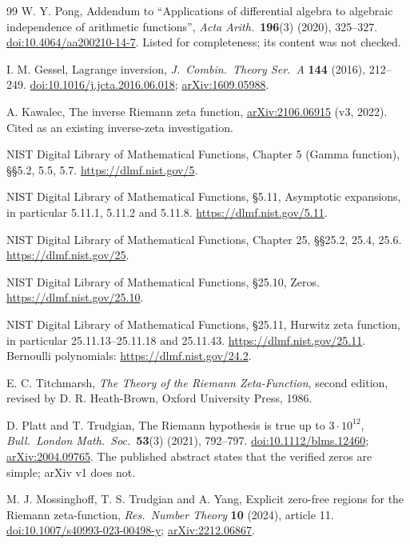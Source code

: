 \documentclass[11pt,a4paper]{article}
\numberwithin{equation}{section}
\theoremstyle{definition}
\theoremstyle{remark}
\begin{document}
\begin{thebibliography}{99}
W. Y. Pong, Addendum to ``Applications of differential algebra to algebraic
independence of arithmetic functions'', \emph{Acta Arith.}\ \textbf{196}(3)
(2020), 325--327.
\href{https://doi.org/10.4064/aa200210-14-7}{doi:10.4064/aa200210-14-7}. Listed
for completeness; its content was not checked.

I. M. Gessel, Lagrange inversion, \emph{J.\ Combin.\ Theory Ser.\ A}
\textbf{144} (2016), 212--249.
\href{https://doi.org/10.1016/j.jcta.2016.06.018}{doi:10.1016/j.jcta.2016.06.018};
\href{https://arxiv.org/abs/1609.05988}{arXiv:1609.05988}.

A. Kawalec, The inverse Riemann zeta function,
\href{https://arxiv.org/abs/2106.06915}{arXiv:2106.06915} (v3, 2022). Cited
as an existing inverse-zeta investigation.

NIST Digital Library of Mathematical Functions, Chapter 5 (Gamma function),
\S\S5.2, 5.5, 5.7. \url{https://dlmf.nist.gov/5}.

NIST Digital Library of Mathematical Functions, \S5.11, Asymptotic
expansions, in particular 5.11.1, 5.11.2 and 5.11.8.
\url{https://dlmf.nist.gov/5.11}.

NIST Digital Library of Mathematical Functions, Chapter 25, \S\S25.2, 25.4,
25.6. \url{https://dlmf.nist.gov/25}.

NIST Digital Library of Mathematical Functions, \S25.10, Zeros.
\url{https://dlmf.nist.gov/25.10}.

NIST Digital Library of Mathematical Functions, \S25.11, Hurwitz zeta
function, in particular 25.11.13--25.11.18 and 25.11.43.
\url{https://dlmf.nist.gov/25.11}. Bernoulli polynomials:
\url{https://dlmf.nist.gov/24.2}.

E. C. Titchmarsh, \emph{The Theory of the Riemann Zeta-Function}, second edition,
revised by D. R. Heath-Brown, Oxford University Press, 1986.

D. Platt and T. Trudgian, The Riemann hypothesis is true up to $3\cdot10^{12}$,
\emph{Bull.\ London Math.\ Soc.}\ \textbf{53}(3) (2021), 792--797.
\href{https://doi.org/10.1112/blms.12460}{doi:10.1112/blms.12460};
\href{https://arxiv.org/abs/2004.09765}{arXiv:2004.09765}. The published
abstract states that the verified zeros are simple; arXiv v1 does not.

M. J. Mossinghoff, T. S. Trudgian and A. Yang, Explicit zero-free regions for the
Riemann zeta-function, \emph{Res.\ Number Theory} \textbf{10} (2024),
article 11. \href{https://doi.org/10.1007/s40993-023-00498-y}{doi:10.1007/s40993-023-00498-y};
\href{https://arxiv.org/abs/2212.06867}{arXiv:2212.06867}.


\end{thebibliography}
\end{document}
